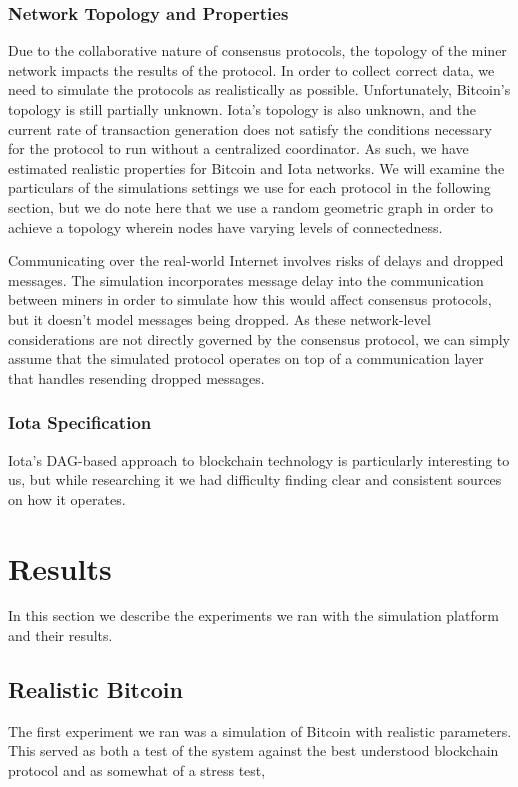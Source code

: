 \documentclass[letterpaper,11pt]{article}
\begin{document}
\subsubsection{Network Topology and Properties}
Due to the collaborative nature of consensus protocols, the topology of the miner network impacts the results of the protocol. In order to collect correct data, we need to simulate the protocols as realistically as possible. Unfortunately, Bitcoin's topology is still partially unknown. Iota's topology is also unknown, and the current rate of transaction generation does not satisfy the conditions necessary for the protocol to run without a centralized coordinator. As such, we have estimated realistic properties for Bitcoin and Iota networks. We will examine the particulars of the simulations settings we use for each protocol in the following section, but we do note here that we use a random geometric graph in order to achieve a topology wherein nodes have varying levels of connectedness.

Communicating over the real-world Internet involves risks of delays and dropped messages. The simulation incorporates message delay into the communication between miners in order to simulate how this would affect consensus protocols, but it doesn't model messages being dropped. As these network-level considerations are not directly governed by the consensus protocol, we can simply assume that the simulated protocol operates on top of a communication layer that handles resending dropped messages.

\subsubsection{Iota Specification}
Iota's DAG-based approach to blockchain technology is particularly interesting to us, but while researching it we had difficulty finding clear and consistent sources on how it operates.

\section{Results}
In this section we describe the experiments we ran with the simulation platform and their results.

\subsection{Realistic Bitcoin}
The first experiment we ran was a simulation of Bitcoin with realistic parameters. This served as both a test of the system against the best understood blockchain protocol and as somewhat of a stress test, 
\end{document}
